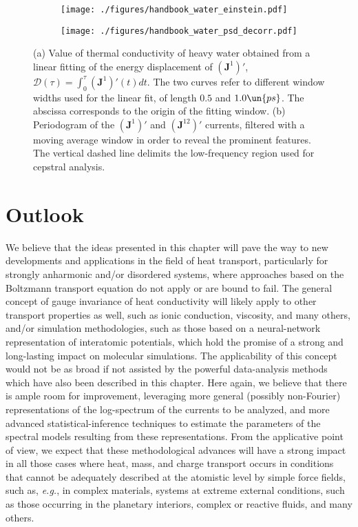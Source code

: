 \begin{figure}
    \centering
    \begin{subfigure}[tb]{1\textwidth}
    	\centering
        \texttt{[image: ./figures/handbook\_water\_einstein.pdf]}
        \caption{}
        \label{fig:disp}
    \end{subfigure}

    \begin{subfigure}[tb]{1\textwidth}
    	\centering
        \texttt{[image: ./figures/handbook\_water\_psd\_decorr.pdf]}
        \caption{}
        \label{fig:water_psd}
    \end{subfigure}
    \caption{(a) Value of thermal conductivity of heavy water obtained from a linear fitting of the energy displacement of
    $\left ( \mathbf{J}^1 \right )'$, $\mathcal{D}(\tau)=\int_0^\tau \left ( \mathbf{J}^1 \right )'(t)dt$. The two curves refer to different window widths used for the linear fit, of length $0.5$ and $1.0\un{ps}$. The abscissa corresponds to the origin of the fitting window. (b) Periodogram of the $\left ( \mathbf{J}^1 \right )'$ and $\left ( \mathbf{J}^{12} \right ) '$ currents, filtered with a moving average window in order to reveal the prominent features. The vertical dashed line delimits the low-frequency region used for cepstral analysis.}
\end{figure}


\section{Outlook}
We believe that the ideas presented in this chapter will pave the way to new developments and applications in the field of heat transport, particularly for strongly anharmonic and/or disordered systems, where approaches based on the Boltzmann transport equation do not apply or are bound to fail. The general concept of gauge invariance of heat conductivity will likely apply to other transport properties as well, such as ionic conduction, viscosity, and many others, and/or simulation methodologies, such as those based on a neural-network representation of interatomic potentials, which hold the promise of a strong and long-lasting impact on molecular simulations. The applicability of this concept would not be as broad if not assisted by the powerful data-analysis methods which have also been described in this chapter. Here again, we believe that there is ample room for improvement, leveraging more general (possibly non-Fourier) representations of the log-spectrum of the currents to be analyzed, and more advanced statistical-inference techniques to estimate the parameters of the spectral models resulting from these representations. From the applicative point of view, we expect that these methodological advances will have a strong impact in all those cases where heat, mass, and charge transport occurs in conditions that cannot be adequately described at the atomistic level by simple force fields, such as, \emph{e.g.}, in complex materials, systems at extreme external conditions, such as those occurring in the planetary interiors, complex or reactive fluids, and many others.



